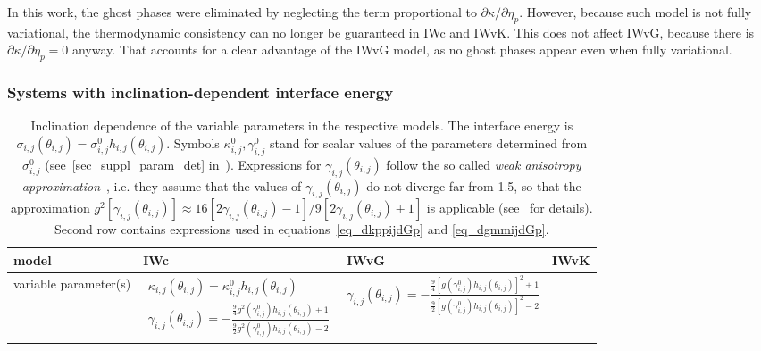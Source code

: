 		In this work, the ghost phases were eliminated by neglecting the term proportional to $\partial \kappa/\partial \eta_p$. However, because such model is not fully variational, the thermodynamic consistency can no longer be guaranteed in IWc and IWvK. This does not affect IWvG, because there is $\partial \kappa/\partial\eta_p=0$ anyway. That accounts for a clear advantage of the IWvG model, as no ghost phases appear even when fully variational.

		\subsubsection{Systems with inclination-dependent interface energy} \label{sec_model_incldepIE}
		\begin{table}
			\centering
			\caption[PF model - inclination dependence of the variable model parameters in the respective models]{Inclination dependence of the variable parameters in the respective models. The interface energy is $\sigma_{i,j}(\theta_{i,j})=\sigma_{i,j}^0h_{i,j}(\theta_{i,j})$. Symbols $\kappa_{i,j}^0, \gamma_{i,j}^0$ stand for scalar values of the parameters determined from $\sigma_{i,j}^0$ (see~\ref{sec_suppl_param_det} in~\cite{Minar2021suppl}). Expressions for $\gamma_{i,j}(\theta_{i,j})$ follow the so called \textit{weak anisotropy approximation}~\cite{Moelans2008}, i.e. they assume that the values of $\gamma_{i,j}(\theta_{i,j})$ do not diverge far from 1.5, so that the approximation $g^2[\gamma_{i,j}(\theta_{i,j})]\approx16[2\gamma_{i,j}(\theta_{i,j})-1]/9[2\gamma_{i,j}(\theta_{i,j}) +1]$ is applicable (see~\cite{Moelans2008} for details). Second row contains expressions used in equations~\ref{eq_dkppijdGp} and \ref{eq_dgmmijdGp}.}
			\label{tab_models_comp__par_incldep}
			\begin{tabular}{p{2cm}|>{\centering\arraybackslash}p{5cm}>{\centering\arraybackslash}p{5cm}>{\centering\arraybackslash}p{4.2cm}}
				\toprule
				model     & IWc & IWvG & IWvK  \\ \hline
				variable parameter(s)     & $\begin{array}{l}
					\kappa_{i,j}(\theta_{i,j})= \kappa_{i,j}^0h_{i,j}(\theta_{i,j}) \\
					\gamma_{i,j}(\theta_{i,j})= -\frac{\frac{9}{4}g^2(\gamma_{i,j}^0)h_{i,j}(\theta_{i,j})+1}{\frac{9}{2}g^2(\gamma_{i,j}^0)h_{i,j}(\theta_{i,j})-2}
				\end{array}$
				& $\gamma_{i,j}(\theta_{i,j})= -\frac{\frac{9}{4}[g(\gamma_{i,j}^0)h_{i,j}(\theta_{i,j})]^2+1}{\frac{9}{2}[g(\gamma_{i,j}^0)h_{i,j}(\theta_{i,j})]^2-2}$

\end{tabular}
\end{table}
